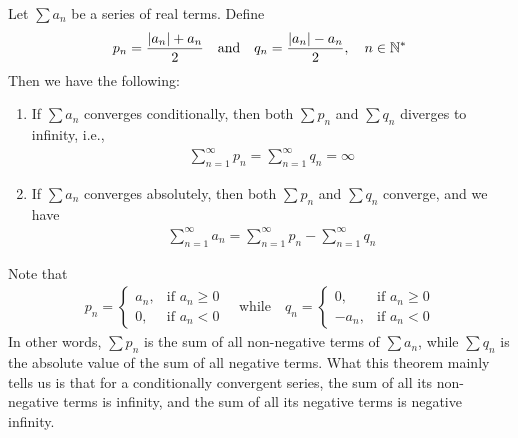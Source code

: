 \documentclass[thmcnt=section, 12pt]{my-elegantbook}
\begin{document}
\begin{theorem} \label{thm:71}
    Let $\sum a_n$ be a series of real terms.
    Define
    \begin{align*}
        p_n = \frac{\left\lvert a_n \right\rvert + a_n}{2}
        \quad \text{and} \quad
        q_n = \frac{\left\lvert a_n \right\rvert - a_n}{2},
        \quad n \in \mathbb{N}^\ast
    \end{align*}
    Then we have the following:
    \begin{enumerate}
        \item If $\sum a_n$ converges conditionally,
              then both $\sum p_n$ and $\sum q_n$ diverges to infinity,
              i.e.,
              \begin{align}
                  \sum_{n=1}^\infty p_n
                  = \sum_{n=1}^\infty q_n
                  = \infty
                  \label{eq:136}
              \end{align}
        \item If $\sum a_n$ converges absolutely,
              then both $\sum p_n$ and $\sum q_n$ converge,
              and we have
              \begin{align}
                  \sum_{n=1}^\infty a_n
                  = \sum_{n=1}^\infty p_n
                  - \sum_{n=1}^\infty q_n
                  \label{eq:137}
              \end{align}
    \end{enumerate}
\end{theorem}

\begin{note}
    Note that
    \begin{align*}
        p_n = \begin{cases}
                  a_n,
                   & \text{if $a_n \geq 0$} \\
                  0,
                   & \text{if $a_n < 0$}
              \end{cases}
        \quad \text{while} \quad
        q_n = \begin{cases}
                  0,
                   & \text{if $a_n \geq 0$} \\
                  -a_n,
                   & \text{if $a_n < 0$}
              \end{cases}
    \end{align*}
    In other words, $\sum p_n$ is the sum of
    all non-negative terms of $\sum a_n$,
    while $\sum q_n$ is the
    absolute value of the
    sum of all negative terms.
    What this theorem mainly tells us
    is that for a conditionally convergent series,
    the sum of all its non-negative terms is infinity,
    and the sum of all its negative terms is negative infinity.
\end{note}
\end{document}
